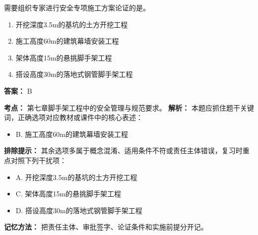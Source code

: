 \documentclass[UTF8,fontset=fandol,11pt]{ctexart}
\begin{document}
\begin{quizbox}[title={第 9 题}]
需要组织专家进行安全专项施工方案论证的是。\\
\begin{enumerate}[label=\Alph*.]
\item 开挖深度3.5m的基坑的土方开挖工程
\item 施工高度60m的建筑幕墙安装工程
\item 架体高度15m的悬挑脚手架工程
\item 搭设高度30m的落地式钢管脚手架工程
\end{enumerate}
\textbf{答案：} B
\vspace{0.25em}
\begin{answerbox}[title={考点解析}]
\textbf{考点：} 第七章脚手架工程中的安全管理与规范要求。
\textbf{解析：} 本题应抓住题干关键词，正确选项对应教材或课件中的核心表述：
\begin{itemize}
\item B. 施工高度60m的建筑幕墙安装工程
\end{itemize}
\textbf{排除提示：} 其余选项多属于概念混淆、适用条件不符或责任主体错误，复习时重点对照下列干扰项：
\begin{itemize}
\item A. 开挖深度3.5m的基坑的土方开挖工程
\item C. 架体高度15m的悬挑脚手架工程
\item D. 搭设高度30m的落地式钢管脚手架工程
\end{itemize}
\textbf{记忆方法：} 把责任主体、审批签字、论证条件和实施前提分开记。
\end{answerbox}
\end{quizbox}
\end{document}
